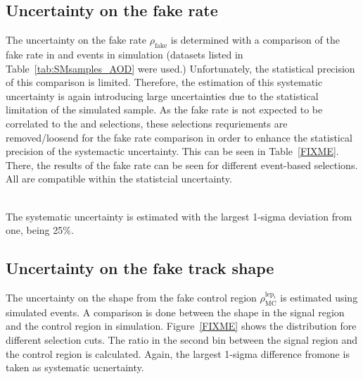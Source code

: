 \subsection{Uncertainty on the fake rate}
\label{sec:FakeRateUncertainty}
The uncertainty on the fake rate $\rho_{\text{fake}}$ is determined with a comparison of the fake rate in \WJets and \Zlep events in simulation (datasets listed in Table~\ref{tab:SMsamples_AOD} were used.)
Unfortunately, the statistical precision of this comparison is limited.
Therefore, the estimation of this systematic uncertainty is again introducing large uncertainties due to the statistical limitation of the simulated \WJets sample.
As the fake rate is not expected to be correlated to the \met and \ptfirstjet  selections, these selections requriements are removed/loosend for the fake rate comparison in order to enhance the statistical precision of the systemactic uncertainty.
This can be seen in Table~\ref{FIXME}.
There, the results of the fake rate can be seen for different event-based selections. All are compatible within the statistcial uncertainty.
\renewcommand{\arraystretch}{1.4}
\begin{table}[!h]
\centering
\caption{Fake rates in simulated \WJets and \Zlep events for different event-based selections ). Right: $\ecalo>10\gev$, $\nhits>6$ and $\ias>0.2$}
\label{tab:LeptonicClosure}
\end{table}\\

The systematic uncertainty is estimated with the largest 1-sigma deviation from one, being 25\%.

\subsection{Uncertainty on the fake track \ias shape}
\label{sec:FakeIasUncertainty}
The uncertainty on the \ias shape from the fake control region $\rho_{\text{MC}}^{\text{lep}_i}$ is estimated using simulated \WJets events.
A comparison is done between the \ias shape in the signal region and the control region in simulation.
Figure~\ref{FIXME} shows the \ias distribution fore different \pt selection cuts.
The ratio in the second bin between the signal region and the control region is calculated.
Again, the largest 1-sigma difference fromone is taken as systematic ucnertainty.

